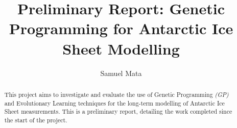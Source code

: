 \documentclass[11pt
              , a4paper
              , twoside
              , openany
              ]{report}
\title{Preliminary Report: Genetic Programming for Antarctic Ice Sheet Modelling}
\author{Samuel Mata}
\date{}
\begin{document}
\frontmatter


\begin{abstract}

This project aims to investigate and evaluate the use of Genetic Programming \textit{(GP)} and Evolutionary Learning techniques for the long-term modelling of Antarctic Ice Sheet measurements. This is a preliminary report, detailing the work completed since the start of the project. 
\end{abstract}


\maketitle


\tableofcontents



\mainmatter









\backmatter



%



\appendix

\end{document}
